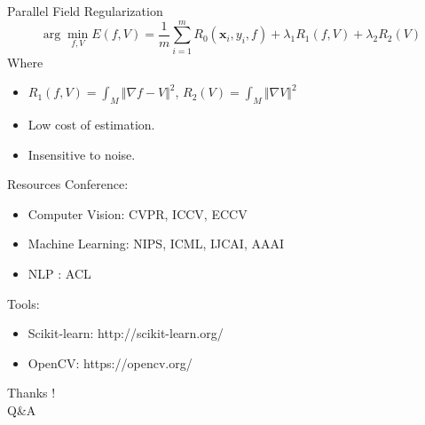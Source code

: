 \documentclass{beamer}
\newcommand{\bol}[1]{\textbf{#1}}
\begin{document}
\begin{darkframes}
  \begin{frame}{Parallel Field Regularization}
  \begin{displaymath}
  	\arg\min_{f,V} E(f, V) = \frac{1}{m}\sum_{i=1}^m R_0(\bol{x}_i, y_i, f) + \lambda_1 R_1(f,V) + \lambda_2 R_2(V)
  \end{displaymath}
  Where
  \begin{itemize}
  	\item $\displaystyle R_1(f,V) = \int_{M}\Vert \nabla f - V \Vert^2$, \qquad $\displaystyle R_2(V) = \int_{M}\Vert \nabla V \Vert^2$
  	\item Low cost of estimation.
  	\item Insensitive to noise.
  \end{itemize}
  \end{frame}
  
  
  
  \begin{frame}{Resources}
  Conference:
  \begin{itemize}
  	\item Computer Vision: CVPR, ICCV, ECCV
  	\item Machine Learning: NIPS, ICML, IJCAI, AAAI
  	\item NLP : ACL
  \end{itemize}
  Tools:
  \begin{itemize}
  	\item Scikit-learn: http://scikit-learn.org/
  	\item OpenCV: https://opencv.org/
  \end{itemize}
  \end{frame}
    \begin{frame}
		\centering\Huge{Thanks !}\\
		\centering\Huge{Q\&A}
	\end{frame}	  
    \end{darkframes}
\end{document}
